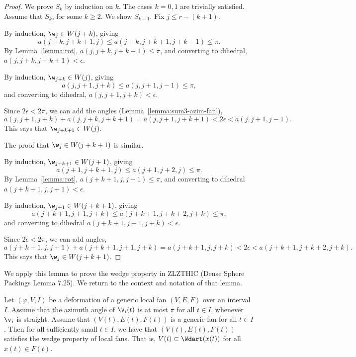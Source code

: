 \begin{proof} We prove $S_k$ by induction on $k$.  The cases $k=0,1$ are trivially satisfied.
Assume that $S_k$, for some $k\ge2$.  We show $S_{k+1}$.  Fix $j\le r-(k+1)$.

By induction, $\w_j\in W({j+k})$, giving
\[
a(j+k,j+k+1,j)\le a(j+k,j+k+1,j+k-1)\le\pi.
\]
By Lemma~\ref{lemma:rot}, $a(j,j+k,j+k+1)\le\pi$, and converting to dihedral, $a(j,j+k,j+k+1)< \epsilon$.

By induction, $\w_{j+k}\in W(j)$, giving
\[
a(j,j+1,j+k)\le a(j,j+1,j-1)\le \pi,
\]
and converting to dihedral, $a(j,j+1,j+k)<\epsilon$.

Since $2\epsilon < 2\pi$, we can add the angles (Lemma~\ref{lemma:sum3-azim-fan}),
\[
a(j,j+1,j+k) + a(j,j+k,j+k+1) = a(j,j+1,j+k+1) < 2\epsilon < a(j,j+1,j-1).
\]
This says that $\w_{j+k+1}\in W(j)$.

The proof that $\w_j\in W({j+k+1})$ is similar.

By induction, $\w_{j+k+1}\in W({j+1})$, giving
\[
a(j+1,j+k+1,j)\le a(j+1,j+2,j)\le \pi.
\]
By Lemma~\ref{lemma:rot}, $a(j+k+1,j,j+1)\le \pi$, and converting to dihedral $a(j+k+1,j,j+1)<\epsilon$.

By induction, $\w_{j+1}\in W({j+k+1})$, giving
\[
a(j+k+1,j+1,j+k)\le a (j+k+1,j+k+2,j+k)\le \pi,
\]
and converting to dihedral $a(j+k+1,j+1,j+k) < \epsilon$.

Since $2\epsilon < 2\pi$, we can add angles,
\[
a(j+k+1,j,j+1) + a(j+k+1,j+1,j+k) = a(j+k+1,j,j+k) < 2 \epsilon < a(j+k+1,j+k+2,j+k).
\]
This says that $\w_{j}\in W({j+k+1})$.
\end{proof}

We apply this lemma to prove the wedge property in ZLZTHIC (Dense Sphere Packings Lemma 7.25).
We return to the context and notation of that lemma.

\begin{corollary}  Let $(\varphi,V,I)$ be a deformation of a generic local fan $(V,E,F)$ over an
interval $I$.  Assume that the azimuth angle of $\v_i(t)$ is at most $\pi$ for all  $t\in I$,
whenever $\v_i$ is straight.  Assume that $(V(t),E(t),F(t))$ is a generic fan for all $t\in I$.
Then for all sufficiently small $t\in I$,  we have that $(V(t),E(t),F(t))$ satisfies the wedge property
of local fans.  That is, $V(t)\subset \Wdart(x(t))$ for all $x(t)\in F(t)$.
\end{corollary}

